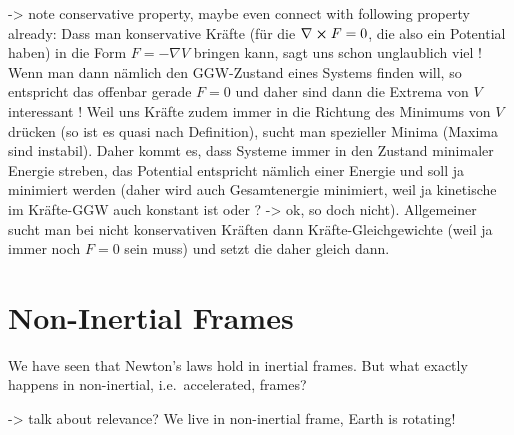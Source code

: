\documentclass[../class_mech_main.tex]{subfiles}
\begin{document}
-> note conservative property, maybe even connect with following property already: Dass man konservative Kräfte (für die $\nabla \cross F = 0$, die also ein Potential haben) in die Form $F = - \nabla V$ bringen kann, sagt uns schon unglaublich viel ! Wenn man dann nämlich den GGW-Zustand eines Systems finden will, so entspricht das offenbar gerade $F = 0$ und daher sind dann die Extrema von $V$ interessant ! Weil uns Kräfte zudem immer in die Richtung des Minimums von $V$ drücken (so ist es quasi nach Definition), sucht man spezieller Minima (Maxima sind instabil). Daher kommt es, dass Systeme immer in den Zustand minimaler Energie streben, das Potential entspricht nämlich einer Energie und soll ja minimiert werden (daher wird auch Gesamtenergie minimiert, weil ja kinetische im Kräfte-GGW auch konstant ist oder ? -> ok, so doch nicht). Allgemeiner sucht man bei nicht konservativen Kräften dann Kräfte-Gleichgewichte (weil ja immer noch $F = 0$ sein muss) und setzt die daher gleich dann.



\newpage



    \section{Non-Inertial Frames}
We have seen that Newton's laws hold in inertial frames. But what exactly happens in non-inertial, i.e.~accelerated, frames?

-> talk about relevance? We live in non-inertial frame, Earth is rotating!

\end{document}
